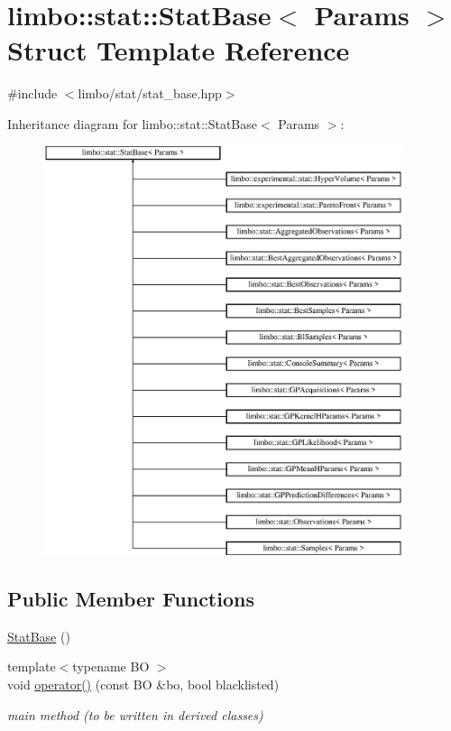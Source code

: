 \hypertarget{structlimbo_1_1stat_1_1_stat_base}{}\section{limbo\+:\+:stat\+:\+:Stat\+Base$<$ Params $>$ Struct Template Reference}
\label{structlimbo_1_1stat_1_1_stat_base}


{\ttfamily \#include $<$limbo/stat/stat\+\_\+base.\+hpp$>$}

Inheritance diagram for limbo\+:\+:stat\+:\+:Stat\+Base$<$ Params $>$\+:\begin{figure}[H]
\begin{center}
\leavevmode
\includegraphics[height=12.000000cm]{structlimbo_1_1stat_1_1_stat_base}
\end{center}
\end{figure}
\subsection*{Public Member Functions}
\begin{DoxyCompactItemize}
\item 
\hyperlink{structlimbo_1_1stat_1_1_stat_base_aac1bea59acf624ed728660823189006f}{Stat\+Base} ()
\item 
{\footnotesize template$<$typename B\+O $>$ }\\void \hyperlink{structlimbo_1_1stat_1_1_stat_base_aaa6c2d6e3b520907955988daf73993ba}{operator()} (const B\+O \&bo, bool blacklisted)
\begin{DoxyCompactList}\small\item\em main method (to be written in derived classes) \end{DoxyCompactList}\end{DoxyCompactItemize}


